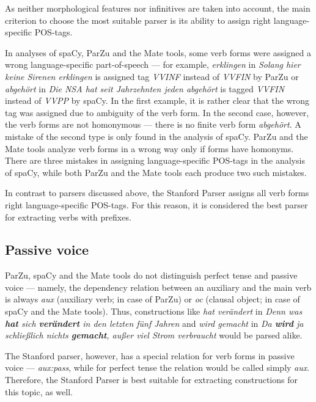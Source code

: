 As neither morphological features nor infinitives are taken into account, the main criterion to choose the most suitable parser is its ability to assign right language-specific POS-tags. 

In analyses of spaCy, ParZu and the Mate tools, some verb forms were assigned a wrong language-specific part-of-speech --- for example, \textit{erklingen} in \textit{Solang hier keine Sirenen erklingen} is assigned tag \textit{VVINF} instead of \textit{VVFIN} by ParZu or \textit{abgehört} in \textit{Die NSA hat seit Jahrzehnten jeden abgehört} is tagged \textit{VVFIN} instead of \textit{VVPP} by spaCy. In the first example, it is rather clear that the wrong tag was assigned due to ambiguity of the verb form. In the second case, however, the verb forms are not homonymous --- there is no finite verb form \textit{abgehört}. A mistake of the second type is only found in the analysis of spaCy. ParZu and the Mate tools analyze verb forms in a wrong way only if forms have homonyms. There are three mistakes in assigning language-specific POS-tags in the analysis of spaCy, while both ParZu and the Mate tools each produce two such mistakes.

In contrast to parsers discussed above, the Stanford Parser assigns all verb forms right language-specific POS-tags. For this reason, it is considered the best parser for extracting verbs with prefixes.

\subsection{Passive voice}

ParZu, spaCy and the Mate tools do not distinguish perfect tense and passive voice --- namely, the dependency relation between an auxiliary and the main verb is always \textit{aux} (auxiliary verb; in case of ParZu) or \textit{oc} (clausal object; in case of spaCy and the Mate tools). Thus, constructions like \textit{hat verändert} in \textit{Denn was \textbf{hat} sich \textbf{verändert} in den letzten fünf Jahren} and \textit{wird gemacht} in \textit{Da \textbf{wird} ja schließlich nichts \textbf{gemacht}, außer viel Strom verbraucht} would be parsed alike.

The Stanford parser, however, has a special relation for verb forms in passive voice --- \textit{aux:pass}, while for perfect tense the relation would be called simply \textit{aux}.  Therefore, the Stanford Parser is best suitable for extracting constructions for this topic, as well.


